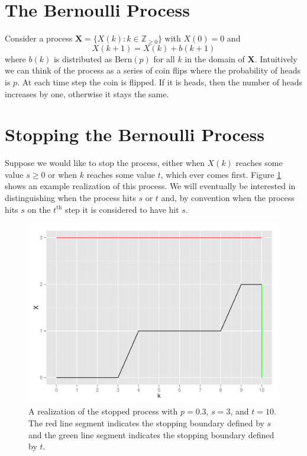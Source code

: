 \documentclass{article}
\newcommand{\Bern}{\mathrm{Bern}}
\begin{document}
\section*{The Bernoulli Process}

Consider a process $\mathbf{X} = \{X(k) : k \in \mathbb{Z}_{\ge 0} \}$
with $X(0)=0$ and 
\begin{equation*} \label{eqn:proc}
X(k+1) = X(k) + b(k+1)
\end{equation*}
where $b(k)$ is distributed as $\Bern(p)$ for all $k$ in the domain of 
$\mathbf{X}$. Intuitively we can think of the process as a series of 
coin flips where the probability of heads is $p$. At each time step 
the coin is flipped. If it is heads, then the number of heads
increases by one, otherwise it stays the same.

\section*{Stopping the Bernoulli Process}

Suppose we would like to stop the process, either when $X(k)$ reaches
some value $s \ge 0$ or when $k$ reaches some value $t$, which ever comes
first. Figure \ref{fig:bp} shows an example realization of this process.
We will eventually be interested in distinguishing when the process hits
$s$ or $t$ and, by convention when the process hits $s$ on the $t^{\text{th}}$
step it is considered to have hit $s$.

\begin{figure}[ht]
\includegraphics[width=\textwidth]{BernoulliProcess.pdf}
\caption{
A realization of the stopped process with $p=0.3$, $s=3$, and $t=10$.
The red line segment indicates the stopping boundary defined by $s$ and 
the green line segment indicates the stopping boundary defined by $t$.
}
\label{fig:bp}
\end{figure}
\end{document}
